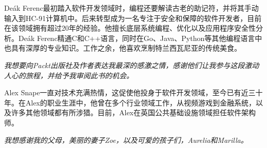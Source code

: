 \noindent
Deák Ferenc最初踏入软件开发领域时，编程还要解读古老的助记符，并将其手动输入到HC-91计算机中。后来转型成为一名专注于安全和保障的软件开发者，目前在该领域拥有超过20年的经验。他擅长底层系统编程、优化以及应用程序安全性分析。Deák Ferenc精通C和C++语言，同时在Go、Java、Python等其他编程语言中也具有深厚的专业知识。工作之余，他喜欢烹制特兰西瓦尼亚的传统美食。
\hspace*{\fill}

\begin{center}

\textit{
我想要向Packt出版社及作者表达我最深的感激之情，感谢他们让我参与这段激动人心的旅程，并给予我审阅此书的机会。
}

\end{center}

\hspace*{\fill}
\hspace*{\fill}

\noindent
Alex Snape一直对技术充满热情，这促使他投身于软件开发领域，至今已有近三十年。在Alex的职业生涯中，他曾在多个行业领域工作，从视频游戏到金融系统，以及许多其他领域都有所涉猎。目前，Alex在英国公共基础设施领域担任软件架构师。

\hspace*{\fill}

\begin{center}

\textit{
我想感谢我的父母，美丽的妻子Zoe，以及可爱的孩子们，Aurelia和Marilla。
}

\end{center}



